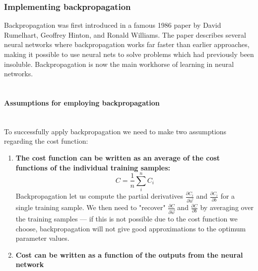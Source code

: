 \documentclass[10pt, a4paper, twocolumn]{article}
\newcommand{\myparagraph}[1]{\paragraph{#1}\mbox{}\\}
\begin{document}
		\subsubsection{Implementing backpropagation}
			Backpropagation was first introduced in a famous 1986 paper by David Rumelhart, Geoffrey Hinton, and Ronald Williams. The paper describes several neural networks where backpropagation works far faster than earlier approaches, making it possible to use neural nets to solve problems which had previously been insoluble. Backpropagation is now the main workhorse of learning in neural networks.\\\\
			
			\myparagraph{Assumptions for employing backpropagation}
			To successfully apply backpropagation we need to make two assumptions regarding the cost function:
			\begin{enumerate}
				\item \textbf{The cost function can be written as an average of the cost functions of the individual training samples:} 
				$$C = \frac{1}{n}\sum_i^n C_i$$
				Backpropagation let us compute the partial derivatives $\frac{\partial C_i}{\partial \vec{w}}$ and $\frac{\partial C_i}{\partial b}$ for a single training sample. We then need to "recover" $\frac{\partial C}{\partial \vec{w}}$ and $\frac{\partial C}{\partial b}$ by averaging over the training samples --- if this is not possible due to the cost function we choose, backpropagation will not give good approximations to the optimum parameter values.
				\item \textbf{Cost can be written as a function of the outputs from the neural network}
				
			\end{enumerate}	
			
\end{document}
